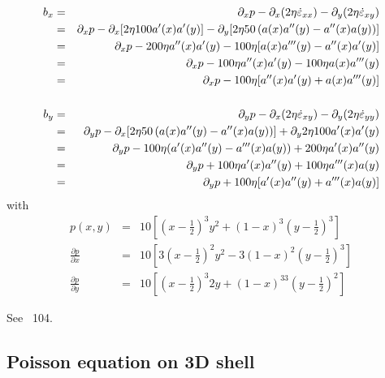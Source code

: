 \begin{eqnarray}
b_x 
&=& \partial_x p - \partial_x (2\eta \dot{\varepsilon}_{xx}) - \partial_y (2\eta \dot{\varepsilon}_{xy}) \nonumber\\
&=& \partial_x p - \partial_x [2 \eta 100 a'(x)a'(y) ]
- \partial_y [2 \eta 50 \left( a(x)a''(y) - a''(x) a(y) \right) ] \nonumber\\
&=& \partial_x p -  200 \eta a''(x)a'(y) - 
100\eta [ a(x)a'''(y) - a''(x)a'(y)] \nonumber\\
&=& \partial_x p - 100 \eta a''(x)a'(y) - 100\eta  a(x)a'''(y) \nonumber\\ 
&=& \partial_x p - 100 \eta [a''(x)a'(y) + a(x)a'''(y) ]
\nonumber\\ \nonumber\\
b_y 
&=&  \partial_y p - \partial_x (2\eta \dot{\varepsilon}_{xy}) - \partial_y (2\eta \dot{\varepsilon}_{yy}) \nonumber\\
&=&  \partial_y p - \partial_x 
[2\eta  50 \left( a(x)a''(y) - a''(x) a(y) \right) ]
+ \partial_y 2 \eta 100 a'(x)a'(y) \nonumber\\
&=&  \partial_y p - 100\eta (a'(x)a''(y) -a'''(x) a(y)  ) + 200 \eta a'(x)a''(y)\nonumber \\ 
&=&  \partial_y p + 100 \eta a'(x)a''(y) + 100 \eta a'''(x) a(y) \nonumber\\
&=& \partial_y p + 100 \eta [ a'(x)a''(y) +  a'''(x) a(y) ] \nonumber
\end{eqnarray}
with 
\begin{eqnarray}
p(x,y)&=&10
\left[
\left(x-\frac12\right)^3y^2
+(1-x)^3\left(y-\frac12\right)^3  
\right]
\nonumber\\
\frac{\partial p}{\partial x} &=& 10 \left[3 \left(x-\frac12\right)^2 y^2
-3 (1-x)^2 \left(y-\frac12\right)^3  \right] \nonumber\\
\frac{\partial p}{\partial y}  &=& 10 \left[  
\left(x-\frac12\right)^3 2y
+(1-x)^33 \left(y-\frac12\right)^2
\right] \nonumber
\end{eqnarray}

See \stone~104.







\subsection{Poisson equation on 3D shell} 

